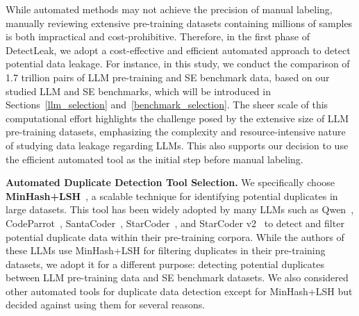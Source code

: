 While automated methods may not achieve the precision of manual labeling, manually reviewing extensive pre-training datasets containing millions of samples is both impractical and cost-prohibitive. Therefore, in the first phase of DetectLeak, we adopt a cost-effective and efficient automated approach to detect potential data leakage. For instance, in this study, we conduct the comparison of 1.7 trillion pairs of LLM pre-training and SE benchmark data,  based on our studied LLM and SE benchmarks, which will be introduced in   Sections~\ref{llm_selection} and~\ref{benchmark_selection}. The sheer scale of this computational effort highlights the challenge posed by the extensive size of LLM pre-training datasets, emphasizing the complexity and resource-intensive nature of studying data leakage regarding LLMs.
This also supports our decision to use the efficient automated tool as the initial step before manual labeling.


\vspace{0.2cm}
\noindent\textbf{Automated Duplicate Detection Tool Selection.}
We specifically choose \textbf{MinHash+LSH}~\cite{SantaCoder, CodeParrot}, a scalable technique for identifying potential duplicates in large datasets. This tool has been widely adopted by many LLMs such as Qwen~\cite{bai2023qwen}, CodeParrot~\cite{CodeParrot}, SantaCoder~\cite{SantaCoder}, StarCoder~\cite{starcoder_one}, and StarCoder v2~\cite{starcoder2} to detect and filter potential duplicate data within their pre-training corpora. 
While the authors of these LLMs use MinHash+LSH for filtering duplicates in their pre-training datasets, we adopt it for a different purpose: detecting potential duplicates between LLM pre-training data and SE benchmark datasets.
We also considered other automated tools for duplicate data detection except for MinHash+LSH but decided against using them for several reasons. 

